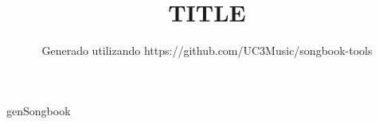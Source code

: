 \documentclass[11pt,a4paper,openany]{book}  %
\begin{document}
\frontmatter  %

\Large

\title{TITLE}
\author{Generado utilizando https://github.com/UC3Music/songbook-tools} 

\maketitle
\cleardoublepage
\tableofcontents
\newpage  %

\mainmatter  %


genSongbook

\backmatter %

\end{document}
